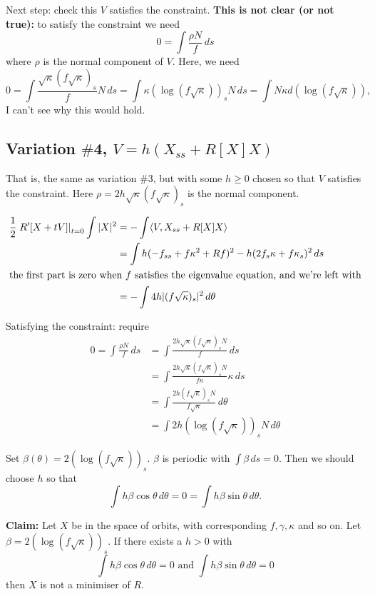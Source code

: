 \documentclass[12pt, a4paper]{amsart}
\theoremstyle{remark}
\begin{document}
Next step:  check this $V$ satisfies the constraint.  \textbf{This is not clear (or not true):}   to satisfy the constraint we need
$$ 0=\int \frac{\rho N}f\,ds $$
where $\rho$ is the normal component of $V$.   Here, we need
$$ 0=\int \frac{\sqrt\kappa (f\sqrt\kappa)_s}f N \,ds=\int  \kappa {(\log(f\sqrt\kappa))_s} N\,ds=  \int N \kappa d(\log(f\sqrt\kappa)),$$
I can't see why this would hold.  


\subsection*{Variation $\#$4, $V=h(X_{ss}+R[X]X)$}

That is, the same as variation $\#3$, but with some $h\ge0$ chosen so that $V$ satisfies the constraint.     Here $\rho=2h\sqrt{\kappa}(f\sqrt\kappa)_s$ is the normal component.

\begin{align*}
\frac12 \left. R'[X+tV]\right|_{t=0}\int|X|^2&= -\int \langle V,X_{ss}+ R[X]X\rangle \\
&= \int h(-f_{ss} + f\kappa^2 + Rf)^2 - h(2f_s\kappa + f\kappa_s)^2 \,ds \\
\intertext{the first part is zero when $f$ satisfies the eigenvalue equation, and we're left with}
&=- \int  4h |(f\sqrt{\kappa})_s|^2 \,d\theta
\end{align*}

Satisfying the constraint: require
\begin{align*} 0=\int \frac{\rho N}f\,ds&= \int \frac{2h\sqrt{\kappa}(f\sqrt\kappa)_s N}f\,ds \\
&=  \int \frac{2h\sqrt{\kappa}(f\sqrt\kappa)_s N}{f\kappa} \kappa \,ds \\
&=  \int \frac{2h(f\sqrt\kappa)_s N}{f\sqrt{\kappa}}  \,d\theta \\
&=  \int {2h(\log (f\sqrt\kappa))_s N}  \,d\theta
 \end{align*}

Set $\beta(\theta)=2 (\log (f\sqrt\kappa))_s$.    $\beta$ is periodic with $\int\beta\,ds=0$.  Then we should choose $h$ so that
\begin{equation} \label{constraint on h} \int h\beta\cos\theta\,d\theta=0=\int h\beta \sin\theta\,d\theta.\end{equation}


\bigskip

\textbf{Claim:}   Let $X$ be in the space of orbits, with corresponding $f,\gamma,\kappa$ and so on.   Let $\beta= 2 (\log (f\sqrt\kappa))_s$.   If there exists a $h>0$ with 
$$\int h \beta \cos\theta\,d\theta=0 \text{ and } \int h \beta \sin\theta\,d\theta=0 $$
then $X$ is not a minimiser of $R$.
\end{document}
